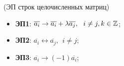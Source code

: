 \begin{definition}(ЭП строк целочисленных матриц)
    \begin{itemize}
        \item \textbf{ЭП1}: $\overline{a_i} \to \overline{a_i} + \lambda \overline{a_j}, \ \ i \neq j, k \in \mathbb{Z}$;
        \item \textbf{ЭП2}: $\overline{a_i} \leftrightarrow  \overline{a_j}, \ \ i \neq j$;
        \item \textbf{ЭП3}: $\overline{a_i} \rightarrow (-1) \overline{a_i}$;
    \end{itemize}
\end{definition}

